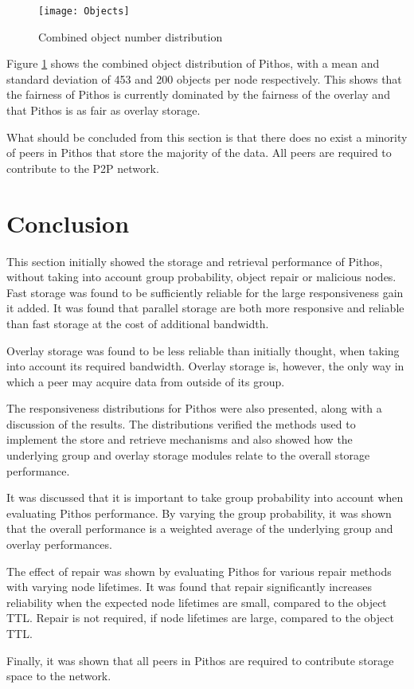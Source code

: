 \begin{figure}[htbp]
 \centering
 \texttt{[image: Objects]}
 \caption{Combined object number distribution}
 \label{fig_objects}
\end{figure}
%
Figure \ref{fig_objects} shows the combined object distribution of Pithos, with a mean and standard deviation of 453 and 200 objects per node respectively. This shows that the fairness of Pithos is currently dominated by the fairness of the overlay and that Pithos is as fair as overlay storage.

What should be concluded from this section is that there does no exist a minority of peers in Pithos that store the majority of the data. All peers are required to contribute to the P2P network.

\section{Conclusion}

This section initially showed the storage and retrieval performance of Pithos, without taking into account group probability, object repair or malicious nodes. Fast storage was found to be sufficiently reliable for the large responsiveness gain it added. It was found that parallel storage are both more responsive and reliable than fast storage at the cost of additional bandwidth.

Overlay storage was found to be less reliable than initially thought, when taking into account its required bandwidth. Overlay storage is, however, the only way in which a peer may acquire data from outside of its group.

The responsiveness distributions for Pithos were also presented, along with a discussion of the results. The distributions verified the methods used to implement the store and retrieve mechanisms and also showed how the underlying group and overlay storage modules relate to the overall storage performance.

It was discussed that it is important to take group probability into account when evaluating Pithos performance. By varying the group probability, it was shown that the overall performance is a weighted average of the underlying group and overlay performances.

The effect of repair was shown by evaluating Pithos for various repair methods with varying node lifetimes. It was found that repair significantly increases reliability when the expected node lifetimes are small, compared to the object TTL. Repair is not required, if node lifetimes are large, compared to the object TTL.

Finally, it was shown that all peers in Pithos are required to contribute storage space to the network.
